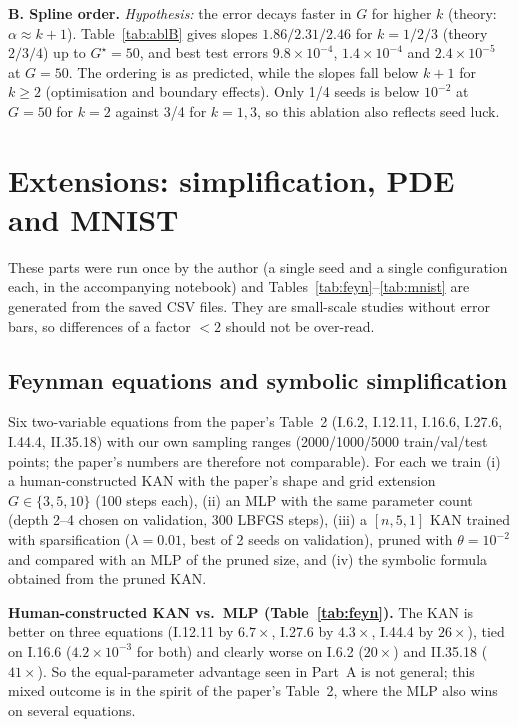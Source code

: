 \textbf{B. Spline order.} \emph{Hypothesis:} the error decays faster in $G$ for higher $k$ (theory: $\alpha\approx k{+}1$). Table~\ref{tab:ablB} gives slopes $1.86/2.31/2.46$ for $k=1/2/3$ (theory $2/3/4$) up to $G^\star{=}50$, and best test errors $9.8\times10^{-4}$, $1.4\times10^{-4}$ and $2.4\times10^{-5}$ at $G{=}50$. The ordering is as predicted, while the slopes fall below $k{+}1$ for $k\ge2$ (optimisation and boundary effects). Only 1/4 seeds is below $10^{-2}$ at $G{=}50$ for $k{=}2$ against 3/4 for $k{=}1,3$, so this ablation also reflects seed luck.


\section{Extensions: simplification, PDE and MNIST}\label{sec:ext}
These parts were run once by the author (a single seed and a single configuration each, in the accompanying notebook) and Tables~\ref{tab:feyn}--\ref{tab:mnist} are generated from the saved CSV files. They are small-scale studies without error bars, so differences of a factor $<2$ should not be over-read.

\subsection{Feynman equations and symbolic simplification}
Six two-variable equations from the paper's Table~2 (I.6.2, I.12.11, I.16.6, I.27.6, I.44.4, II.35.18) with our own sampling ranges (2000/1000/5000 train/val/test points; the paper's numbers are therefore not comparable). For each we train (i) a human-constructed KAN with the paper's shape and grid extension $G\in\{3,5,10\}$ (100 steps each), (ii) an MLP with the same parameter count (depth 2--4 chosen on validation, 300 LBFGS steps), (iii) a $[n,5,1]$ KAN trained with sparsification ($\lambda{=}0.01$, best of 2 seeds on validation), pruned with $\theta{=}10^{-2}$ and compared with an MLP of the pruned size, and (iv) the symbolic formula obtained from the pruned KAN.

\textbf{Human-constructed KAN vs.\ MLP (Table~\ref{tab:feyn}).} The KAN is better on three equations (I.12.11 by $6.7\times$, I.27.6 by $4.3\times$, I.44.4 by $26\times$), tied on I.16.6 ($4.2\times10^{-3}$ for both) and clearly worse on I.6.2 ($20\times$) and II.35.18 ($41\times$). So the equal-parameter advantage seen in Part~A is not general; this mixed outcome is in the spirit of the paper's Table~2, where the MLP also wins on several equations.

